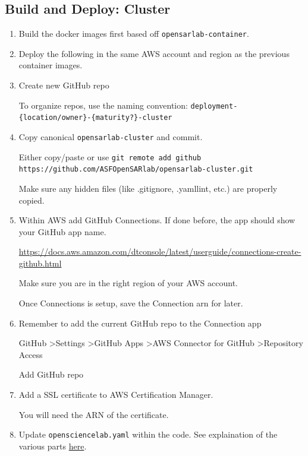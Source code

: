 \subsection{Build and Deploy: Cluster}

\begin{enumerate}
\item Build the docker images first based off \texttt{opensarlab-container}.


\item Deploy the following in the same AWS account and region as the previous container images.


\item Create new GitHub repo

To organize repos, use the naming convention: \texttt{deployment-\{location/owner\}-\{maturity?\}-cluster}


\item Copy canonical \texttt{opensarlab-cluster} and commit.

Either copy/paste or use \texttt{git remote add github https://github.com/ASFOpenSARlab/opensarlab-cluster.git}

Make sure any hidden files (like .gitignore, .yamllint, etc.) are properly copied.


\item Within AWS add GitHub Connections. If done before, the app should show your GitHub app name.

\href{https://docs.aws.amazon.com/dtconsole/latest/userguide/connections-create-github.html}{https://docs.aws.amazon.com/dtconsole/latest/userguide/connections-create-github.html}

Make sure you are in the right region of your AWS account.

Once Connections is setup, save the Connection arn for later.


\item Remember to add the current GitHub repo to the Connection app

GitHub \textgreater  Settings \textgreater  GitHub Apps \textgreater  AWS Connector for GitHub \textgreater  Repository Access

Add GitHub repo


\item Add a SSL certificate to AWS Certification Manager.

You will need the ARN of the certificate.


\item Update \texttt{opensciencelab.yaml} within the code. See explaination of the various parts \href{../opensciencelab\_yaml.md}{here}.



\end{enumerate}
